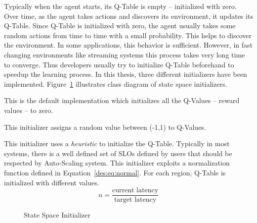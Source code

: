 \clearpage
Typically when the agent starts, its Q-Table is empty -- initialized with zero. Over time, as the agent takes actions and discovers its environment, it updates its Q-Table. Since Q-Table is initialized with zero, the agent usually takes some random actions from time to time with a small probability. This helps to discover the environment. In some applications, this behavior is sufficient. However, in fast changing environments like streaming systems this process takes very long time to converge. Thus developers usually try to initialize Q-Table beforehand to speedup the learning process. In this thesis, three different initializers have been implemented. Figure~\ref{des:f:ss-init} illustrates class diagram of state space initializers.
\begin{description}[leftmargin=0pt]
\item[Zero Initializer] This is the default implementation which initializes all the Q-Values -- reward values -- to zero.
\item[Random Initializer] This initializer assigns a random value between (-1,1) to Q-Values.
\item[Optimized Initializer] This initializer uses a \emph{heuristic} to initialize the Q-Table. Typically in most systems, there is a well defined set of SLOs defined by users that should be respected by Auto-Scaling system. This initializer exploits a normalization function defined in Equation~\ref{des:eq:normal}.  For each region, Q-Table is initialized with different values.
\begin{equation}
n = \frac{\text{current latency}}{\text{target latency}}
\label{des:eq:normal}
\end{equation}
\end{description}
\begin{figure}[hb]
    \centering
    \caption{State Space Initializer}
    \label{des:f:ss-init}
\end{figure}

